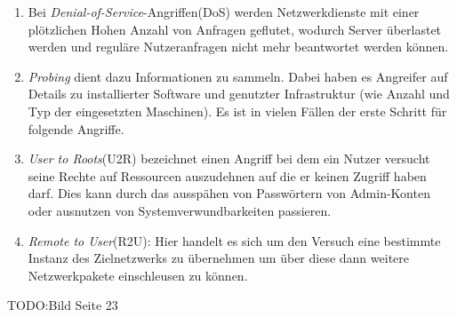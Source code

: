 \begin{enumerate}
\item Bei \textit{Denial-of-Service}-Angriffen(DoS) werden Netzwerkdienste mit einer plötzlichen Hohen Anzahl von Anfragen geflutet, wodurch Server überlastet werden und reguläre Nutzeranfragen nicht mehr beantwortet werden können.
\item \textit{Probing} dient dazu Informationen zu sammeln. Dabei haben es Angreifer auf Details zu installierter Software und genutzter Infrastruktur (wie Anzahl und Typ der eingesetzten Maschinen). Es ist in vielen Fällen der erste Schritt für folgende Angriffe.
\item \textit{User to Roots}(U2R) bezeichnet einen Angriff bei dem ein Nutzer versucht seine Rechte auf Ressourcen auszudehnen auf die er keinen Zugriff haben darf. Dies kann durch das ausspähen von Passwörtern von Admin-Konten oder ausnutzen von Systemverwundbarkeiten passieren.
\item \textit{Remote to User}(R2U): Hier handelt es sich um den Versuch eine bestimmte Instanz des Zielnetzwerks zu übernehmen um über diese dann weitere Netzwerkpakete einschleusen zu können.
\end{enumerate}
TODO:Bild Seite 23

